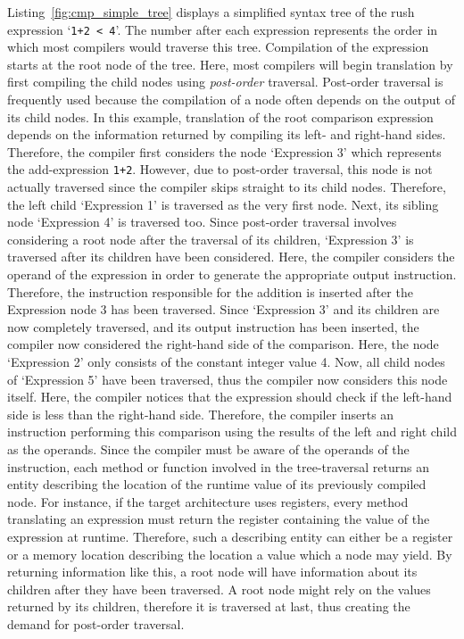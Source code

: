 Listing~\ref{fig:cmp_simple_tree} displays a simplified syntax tree of the rush expression `\texttt{1+2 < 4}'.
The number after each expression represents the order in which most compilers would traverse this tree.
Compilation of the expression starts at the root node of the tree.
Here, most compilers will begin translation by first compiling the child nodes using \emph{post-order} traversal.
Post-order traversal is frequently used because the compilation of a node often depends on the output of its child nodes.
In this example, translation of the root comparison expression depends on the information returned by compiling its left- and right-hand sides.
Therefore, the compiler first considers the node `Expression 3' which represents the add-expression \texttt{1+2}.
However, due to post-order traversal, this node is not actually traversed since the compiler skips straight to its child nodes.
Therefore, the left child `Expression 1' is traversed as the very first node.
Next, its sibling node `Expression 4' is traversed too.
Since post-order traversal involves considering a root node after the traversal of its children, `Expression 3' is traversed after its children have been considered.
Here, the compiler considers the operand of the expression in order to generate the appropriate output instruction.
Therefore, the instruction responsible for the addition is inserted after the Expression node 3 has been traversed.
Since `Expression 3' and its children are now completely traversed, and its output instruction has been inserted, the compiler now considered the right-hand side of the comparison.
Here, the node `Expression 2' only consists of the constant integer value 4.
Now, all child nodes of `Expression 5' have been traversed, thus the compiler now considers this node itself.
Here, the compiler notices that the expression should check if the left-hand side is less than the right-hand side.
Therefore, the compiler inserts an instruction performing this comparison using the results of the left and right child as the operands.
Since the compiler must be aware of the operands of the instruction, each method or function involved in the tree-traversal returns an entity describing the location of the runtime value of its previously compiled node.
For instance, if the target architecture uses registers, every method translating an expression must return the register containing the value of the expression at runtime.
Therefore, such a describing entity can either be a register or a memory location describing the location a value which a node may yield.
By returning information like this, a root node will have information about its children after they have been traversed.
A root node might rely on the values returned by its children, therefore it is traversed at last, thus creating the demand for post-order traversal.

